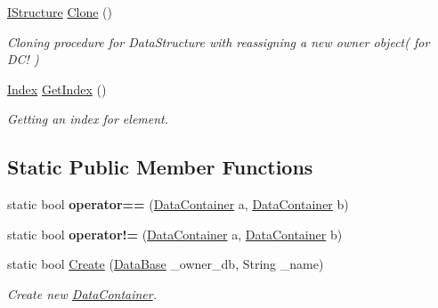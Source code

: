 \begin{DoxyCompactItemize}
\item 
\hyperlink{interface_dwarf_d_b_1_1_data_structures_1_1_i_structure}{IStructure} \hyperlink{class_dwarf_d_b_1_1_data_structures_1_1_data_container_a246c00add5642b9674339a0319bae617}{Clone} ()
\begin{DoxyCompactList}\small\item\em Cloning procedure for DataStructure with reassigning a new owner object( for DC! ) \item\end{DoxyCompactList}\item 
\hyperlink{class_dwarf_d_b_1_1_data_structures_1_1_index}{Index} \hyperlink{class_dwarf_d_b_1_1_data_structures_1_1_data_container_a195b9a3fcaa91d3240e07164c1d5c460}{GetIndex} ()
\begin{DoxyCompactList}\small\item\em Getting an index for element. \item\end{DoxyCompactList}\end{DoxyCompactItemize}
\subsection*{Static Public Member Functions}
\begin{DoxyCompactItemize}
\item 
\hypertarget{class_dwarf_d_b_1_1_data_structures_1_1_data_container_a7a47a45e62754b629dc06c57438a4eca}{
static bool {\bfseries operator==} (\hyperlink{class_dwarf_d_b_1_1_data_structures_1_1_data_container}{DataContainer} a, \hyperlink{class_dwarf_d_b_1_1_data_structures_1_1_data_container}{DataContainer} b)}
\label{class_dwarf_d_b_1_1_data_structures_1_1_data_container_a7a47a45e62754b629dc06c57438a4eca}

\item 
\hypertarget{class_dwarf_d_b_1_1_data_structures_1_1_data_container_aa59ee6235912ea37a590efe9a147b704}{
static bool {\bfseries operator!=} (\hyperlink{class_dwarf_d_b_1_1_data_structures_1_1_data_container}{DataContainer} a, \hyperlink{class_dwarf_d_b_1_1_data_structures_1_1_data_container}{DataContainer} b)}
\label{class_dwarf_d_b_1_1_data_structures_1_1_data_container_aa59ee6235912ea37a590efe9a147b704}

\item 
static bool \hyperlink{class_dwarf_d_b_1_1_data_structures_1_1_data_container_a57324435e4d7961b4b875588b9a86f3d}{Create} (\hyperlink{class_dwarf_d_b_1_1_data_structures_1_1_data_base}{DataBase} \_\-owner\_\-db, String \_\-name)
\begin{DoxyCompactList}\small\item\em Create new \hyperlink{class_dwarf_d_b_1_1_data_structures_1_1_data_container}{DataContainer}. \item\end{DoxyCompactList}\end{DoxyCompactItemize}
